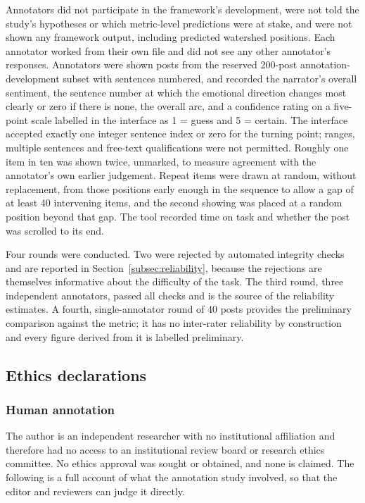 \documentclass[fleqn,10pt]{wlscirep}
\begin{document}
Annotators did not participate in the framework's development, were not told the study's hypotheses or which metric-level predictions were at stake, and were not shown any framework output, including predicted watershed positions. Each annotator worked from their own file and did not see any other annotator's responses. Annotators were shown posts from the reserved 200-post annotation-development subset with sentences numbered, and recorded the narrator's overall sentiment, the sentence number at which the emotional direction changes most clearly or zero if there is none, the overall arc, and a confidence rating on a five-point scale labelled in the interface as 1 = guess and 5 = certain. The interface accepted exactly one integer sentence index or zero for the turning point; ranges, multiple sentences and free-text qualifications were not permitted. Roughly one item in ten was shown twice, unmarked, to measure agreement with the annotator's own earlier judgement. Repeat items were drawn at random, without replacement, from those positions early enough in the sequence to allow a gap of at least 40 intervening items, and the second showing was placed at a random position beyond that gap. The tool recorded time on task and whether the post was scrolled to its end.

Four rounds were conducted. Two were rejected by automated integrity checks and are reported in Section~\ref{subsec:reliability}, because the rejections are themselves informative about the difficulty of the task. The third round, three independent annotators, passed all checks and is the source of the reliability estimates. A fourth, single-annotator round of 40 posts provides the preliminary comparison against the metric; it has no inter-rater reliability by construction and every figure derived from it is labelled preliminary.

\subsection{Ethics declarations}\label{subsec:ethics}

\subsubsection*{Human annotation}

The author is an independent researcher with no institutional affiliation and
therefore had no access to an institutional review board or research ethics
committee. No ethics approval was sought or obtained, and none is claimed. The
following is a full account of what the annotation study involved, so that the
editor and reviewers can judge it directly.
\end{document}
